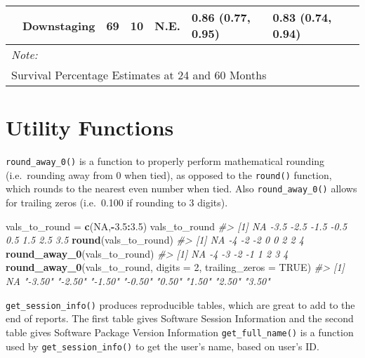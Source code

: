 \documentclass[table]{article}
\newenvironment{Shaded}{\begin{snugshade}}{\end{snugshade}}
\newcommand{\CommentTok}[1]{\textcolor[rgb]{0.56,0.35,0.01}{\textit{#1}}}
\newcommand{\DataTypeTok}[1]{\textcolor[rgb]{0.13,0.29,0.53}{#1}}
\newcommand{\DecValTok}[1]{\textcolor[rgb]{0.00,0.00,0.81}{#1}}
\newcommand{\FloatTok}[1]{\textcolor[rgb]{0.00,0.00,0.81}{#1}}
\newcommand{\KeywordTok}[1]{\textcolor[rgb]{0.13,0.29,0.53}{\textbf{#1}}}
\newcommand{\NormalTok}[1]{#1}
\newcommand{\OperatorTok}[1]{\textcolor[rgb]{0.81,0.36,0.00}{\textbf{#1}}}
\newcommand{\OtherTok}[1]{\textcolor[rgb]{0.56,0.35,0.01}{#1}}
\newcommand{\StringTok}[1]{\textcolor[rgb]{0.31,0.60,0.02}{#1}}
\begin{document}
\begin{table}[t]
\begin{tabular}{llrrllll}
\hspace{1em} & Downstaging & 69 & 10 & N.E. & 0.86 (0.77, 0.95) & 0.83 (0.74, 0.94) & \\
\bottomrule
\multicolumn{8}{l}{\textit{Note: }}\\
\multicolumn{8}{l}{Survival Percentage Estimates at 24 and 60 Months}\\
\end{tabular}
\end{table}

\clearpage

\hypertarget{utility-functions}{%
\section{Utility Functions}\label{utility-functions}}

\texttt{round\_away\_0()} is a function to properly perform mathematical
rounding (i.e.~rounding away from 0 when tied), as opposed to the
\texttt{round()} function, which rounds to the nearest even number when
tied. Also \texttt{round\_away\_0()} allows for trailing zeros
(i.e.~0.100 if rounding to 3 digits).

\begin{Shaded}
\begin{Highlighting}[]
\NormalTok{vals_to_round =}\StringTok{ }\KeywordTok{c}\NormalTok{(}\OtherTok{NA}\NormalTok{,}\OperatorTok{-}\FloatTok{3.5}\OperatorTok{:}\FloatTok{3.5}\NormalTok{)}
\NormalTok{vals_to_round}
\CommentTok{#> [1]   NA -3.5 -2.5 -1.5 -0.5  0.5  1.5  2.5  3.5}
\KeywordTok{round}\NormalTok{(vals_to_round)}
\CommentTok{#> [1] NA -4 -2 -2  0  0  2  2  4}
\KeywordTok{round_away_0}\NormalTok{(vals_to_round)}
\CommentTok{#> [1] NA -4 -3 -2 -1  1  2  3  4}
\KeywordTok{round_away_0}\NormalTok{(vals_to_round, }\DataTypeTok{digits =} \DecValTok{2}\NormalTok{, }\DataTypeTok{trailing_zeros =} \OtherTok{TRUE}\NormalTok{)}
\CommentTok{#> [1] NA      "-3.50" "-2.50" "-1.50" "-0.50" "0.50"  "1.50"  "2.50"  "3.50"}
\end{Highlighting}
\end{Shaded}

\texttt{get\_session\_info()} produces reproducible tables, which are
great to add to the end of reports. The first table gives Software
Session Information and the second table gives Software Package Version
Information \texttt{get\_full\_name()} is a function used by
\texttt{get\_session\_info()} to get the user's name, based on user's
ID.
\end{document}
